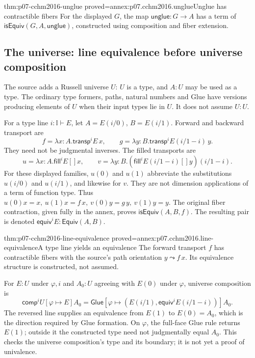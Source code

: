 \begin{hbtheorem}{thm:p07-cchm2016-unglue}
 {proved=annex:p07.cchm2016.unglue}{Unglue has contractible fibers}
For the displayed \(G\), the map
\(\mathsf{unglue}:G\to A\) has a term of
\(\mathsf{isEquiv}(G,A,\mathsf{unglue})\), constructed using
composition and fiber extension.
\end{hbtheorem}

\subsection{The universe: line equivalence before universe composition}
\label{sec:p07-cchm2016-universe}

The source adds a Russell universe \(U\): \(U\) is a type, and
\(A:U\) may be used as a type.  The ordinary type formers, paths,
natural numbers and Glue have versions producing elements of \(U\)
when their input types lie in \(U\).  It does not assume \(U:U\).

For a type line \(i:\mathbb I\vdash E\), let \(A=E(i/0)\),
\(B=E(i/1)\).  Forward and backward transport are
\[
 f=\lambda x:A.\mathsf{transp}^{i}E\,x,\qquad
 g=\lambda y:B.\mathsf{transp}^{i}E(i/1-i)\,y.
\]
They need not be judgmental inverses.  The filled transports are
\[
 u=\lambda x:A.\mathsf{fill}^{i}E[]x,\qquad
 v=\lambda y:B.(\mathsf{fill}^{i}E(i/1-i)[]y)(i/1-i).
\]
For these displayed families, \(u(0)\) and \(u(1)\) abbreviate
the substitutions \(u(i/0)\) and \(u(i/1)\), and likewise for \(v\).
They are not dimension applications of a term of function type.
Thus \(u(0)x=x,\ u(1)x=f\,x,\ v(0)y=g\,y,\ v(1)y=y\).
The original fiber contraction, given fully in the annex, proves
\(\mathsf{isEquiv}(A,B,f)\).  The resulting pair is denoted
\(\mathsf{equiv}^{i}E:\mathsf{Equiv}(A,B)\).

\begin{hbtheorem}{thm:p07-cchm2016-line-equivalence}
 {proved=annex:p07.cchm2016.line-equivalence}{A type line yields an equivalence}
The forward transport \(f\) has contractible fibers with the source's
path orientation \(y\leadsto f\,x\).  Its equivalence structure is
constructed, not assumed.
\end{hbtheorem}

For \(E:U\) under \(\varphi,i\) and \(A_0:U\) agreeing with \(E(0)\)
under \(\varphi\), universe composition is
\[
 \mathsf{comp}^{i}U[\varphi\mapsto E]A_0
 =\mathsf{Glue}
 [\varphi\mapsto(E(i/1),\mathsf{equiv}^{i}E(i/1-i))]A_0 .
\]
The reversed line supplies an equivalence from \(E(1)\) to
\(E(0)=A_0\), which is the direction required by Glue formation.
On \(\varphi\), the full-face Glue rule returns \(E(1)\);
outside it the constructed type need not judgmentally equal \(A_0\).
This checks the universe composition's type and its boundary; it is
not yet a proof of univalence.

